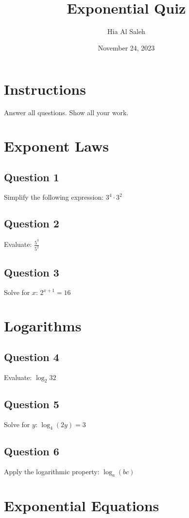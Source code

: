 \documentclass[12pt]{article}
\begin{document}
\title{Exponential Quiz}
\author{Hia Al Saleh}
\date{November 24, 2023}
\maketitle

\section*{Instructions}
Answer all questions. Show all your work.

\section*{Exponent Laws}

\subsection*{Question 1}
Simplify the following expression: $3^4 \cdot 3^2$

\subsection*{Question 2}
Evaluate: $\frac{5^3}{5^2}$

\subsection*{Question 3}
Solve for $x$: $2^{x+1} = 16$

\section*{Logarithms}

\subsection*{Question 4}
Evaluate: $\log_2 32$

\subsection*{Question 5}
Solve for $y$: $\log_4 (2y) = 3$

\subsection*{Question 6}
Apply the logarithmic property: $\log_a (bc)$

\section*{Exponential Equations}
\end{document}

